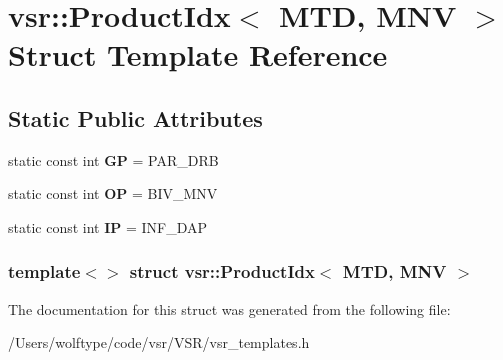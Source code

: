 \hypertarget{structvsr_1_1_product_idx_3_01_m_t_d_00_01_m_n_v_01_4}{\section{vsr\-:\-:Product\-Idx$<$ M\-T\-D, M\-N\-V $>$ Struct Template Reference}
\label{structvsr_1_1_product_idx_3_01_m_t_d_00_01_m_n_v_01_4}
}
\subsection*{Static Public Attributes}
\begin{DoxyCompactItemize}
\item 
\hypertarget{structvsr_1_1_product_idx_3_01_m_t_d_00_01_m_n_v_01_4_ab0e4131c15b466cc9cbf8c3f86a1b42d}{static const int {\bfseries G\-P} = P\-A\-R\-\_\-\-D\-R\-B}\label{structvsr_1_1_product_idx_3_01_m_t_d_00_01_m_n_v_01_4_ab0e4131c15b466cc9cbf8c3f86a1b42d}

\item 
\hypertarget{structvsr_1_1_product_idx_3_01_m_t_d_00_01_m_n_v_01_4_ae08d49aca265f51ac542ec4cf845ff92}{static const int {\bfseries O\-P} = B\-I\-V\-\_\-\-M\-N\-V}\label{structvsr_1_1_product_idx_3_01_m_t_d_00_01_m_n_v_01_4_ae08d49aca265f51ac542ec4cf845ff92}

\item 
\hypertarget{structvsr_1_1_product_idx_3_01_m_t_d_00_01_m_n_v_01_4_a6623be13ba9bd02f4af3b615ce864864}{static const int {\bfseries I\-P} = I\-N\-F\-\_\-\-D\-A\-P}\label{structvsr_1_1_product_idx_3_01_m_t_d_00_01_m_n_v_01_4_a6623be13ba9bd02f4af3b615ce864864}

\end{DoxyCompactItemize}
\subsubsection*{template$<$$>$ struct vsr\-::\-Product\-Idx$<$ M\-T\-D, M\-N\-V $>$}



The documentation for this struct was generated from the following file\-:\begin{DoxyCompactItemize}
\item 
/\-Users/wolftype/code/vsr/\-V\-S\-R/vsr\-\_\-templates.\-h\end{DoxyCompactItemize}
